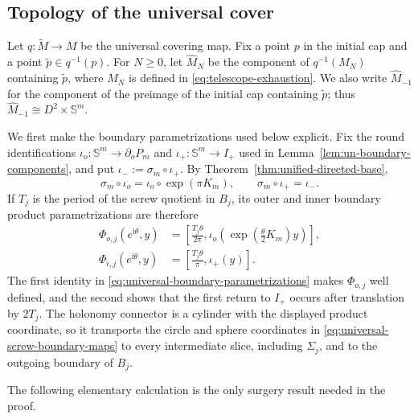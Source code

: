 \documentclass[11pt,reqno]{amsart}
\theoremstyle{definition}
\numberwithin{equation}{section}
\begin{document}
\subsection{Topology of the universal cover}
\label{subs:topology-of-the-universal-cover}


Let \(q:\widetilde M\to M\) be the universal covering map.  Fix a point
\(p\) in the initial cap and a point \(\widetilde p\in q^{-1}(p)\).  For
\(N\ge0\), let \(\widehat M_N\) be the component of \(q^{-1}(M_N)\)
containing \(\widetilde p\), where \(M_N\) is defined in
\eqref{eq:telescope-exhaustion}.  We also write \(\widehat M_{-1}\) for
the component of the preimage of the initial cap containing
\(\widetilde p\); thus \(\widehat M_{-1}\cong D^2\times\mathbb S^m\).

We first make the boundary parametrizations used below explicit.  Fix
the round identifications
\(\iota_o:\mathbb S^m\to\partial_oP_m\) and
\(\iota_+:\mathbb S^m\to I_+\) used in
Lemma~\ref{lem:un-boundary-components}, and put
\(\iota_-:=\sigma_m\circ\iota_+\).  By
Theorem~\ref{thm:unified-directed-base},
\begin{equation}\label{eq:universal-boundary-parametrizations}
 \sigma_m\circ\iota_o
 =\iota_o\circ\exp(\pi K_m),
 \qquad
 \sigma_m\circ\iota_+=\iota_-.
\end{equation}
If \(T_j\) is the period of the screw quotient in \(B_j\), its outer
and inner boundary product parametrizations are therefore
\begin{equation}\label{eq:universal-screw-boundary-maps}
 \begin{aligned}
  \Phi_{o,j}(e^{\mathrm i\theta},y)
  &=\left[\frac{T_j\theta}{2\pi},
    \iota_o\!\left(\exp\left(\frac\theta2K_m\right)y\right)\right],\\
  \Phi_{i,j}(e^{\mathrm i\theta},y)
  &=\left[\frac{T_j\theta}{\pi},\iota_+(y)\right].
 \end{aligned}
\end{equation}
The first identity in \eqref{eq:universal-boundary-parametrizations}
makes \(\Phi_{o,j}\) well defined, and the second shows that the first
return to \(I_+\) occurs after translation by \(2T_j\).  The holonomy
connector is a cylinder with the displayed product coordinate, so it
transports the circle and sphere coordinates in
\eqref{eq:universal-screw-boundary-maps} to every intermediate slice,
including \(\Sigma_j\), and to the outgoing boundary of \(B_j\).

The following elementary calculation is the only surgery result needed
in the proof.
\end{document}
